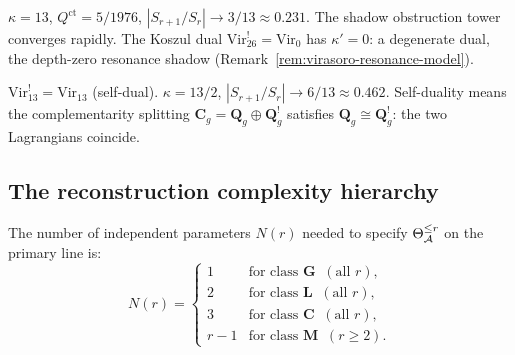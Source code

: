 \begin{example}[Critical string, $c = 26$]
\label{ex:critical-string-shadow}
$\kappa = 13$, $Q^{\mathrm{ct}} = 5/1976$,
$|S_{r+1}/S_r| \to 3/13 \approx 0.231$.
The shadow obstruction tower converges rapidly. The Koszul dual
$\mathrm{Vir}_{26}^! = \mathrm{Vir}_0$ has $\kappa' = 0$:
a degenerate dual, the depth-zero resonance shadow
(Remark~\ref{rem:virasoro-resonance-model}).
\end{example}

\begin{example}[Virasoro self-duality, $c = 13$]
\label{ex:virasoro-self-dual}
$\mathrm{Vir}_{13}^! = \mathrm{Vir}_{13}$
(self-dual). $\kappa = 13/2$,
$|S_{r+1}/S_r| \to 6/13 \approx 0.462$.
Self-duality means the complementarity splitting
$\mathbf{C}_g = \mathbf{Q}_g \oplus \mathbf{Q}_g^!$
satisfies $\mathbf{Q}_g \cong \mathbf{Q}_g^!$:
the two Lagrangians coincide.
\end{example}


\subsection{The reconstruction complexity hierarchy}
\label{subsec:complexity-hierarchy}

\begin{theorem}
\label{thm:complexity-hierarchy}
The number of independent parameters $N(r)$ needed to
specify $\Theta_{\mathcal{A}}^{\leq r}$ on the primary line is:
\begin{equation}\label{eq:complexity-hierarchy}
N(r) = \begin{cases}
1 & \text{for class } \textbf{G}\;\;(\text{all } r), \\
2 & \text{for class } \textbf{L}\;\;(\text{all } r), \\
3 & \text{for class } \textbf{C}\;\;(\text{all } r), \\
r - 1 & \text{for class } \textbf{M}\;\;(r \geq 2).
\end{cases}
\end{equation}
\end{theorem}

